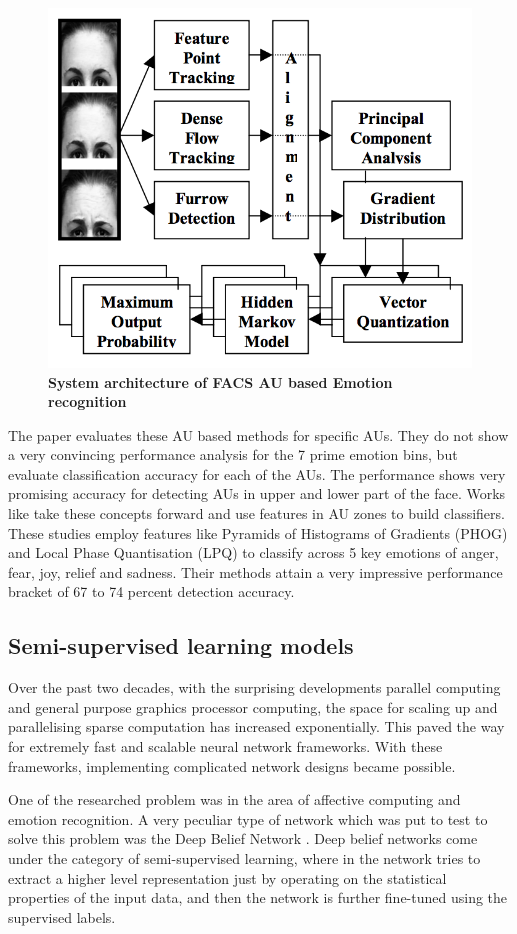 \begin{figure}
\centering
\includegraphics[width=\columnwidth]{figures/FAU_Kanade}
\caption{\textbf{System architecture of FACS AU based Emotion recognition}}
\label{fig:FACSAU}
\end{figure}

The paper evaluates these AU based methods for specific AUs. They do not show a very convincing performance analysis for the 7 prime emotion bins, but evaluate classification accuracy for each of the AUs. The performance shows very promising accuracy for detecting AUs in upper and lower part of the face. Works like \cite{1027968} \cite{5771366} take these concepts forward and use features in AU zones to build classifiers. These studies employ features like Pyramids of Histograms of Gradients (PHOG) and Local Phase Quantisation (LPQ) to classify across 5 key emotions of anger, fear, joy, relief and sadness. Their methods attain a very impressive performance bracket of 67 to 74 percent detection accuracy.

\subsection{ Semi-supervised learning models }
Over the past two decades, with the surprising developments parallel computing and general purpose graphics processor computing, the space for scaling up and parallelising sparse computation has increased exponentially. This paved the way for extremely fast and scalable neural network frameworks. With these frameworks, implementing complicated network designs became possible.
\par
One of the researched problem was in the area of affective computing and emotion recognition. A very peculiar type of network which was put to test to solve this problem was the Deep Belief Network \cite{Hinton:2006} . Deep belief networks come under the category of semi-supervised learning, where in the network tries to extract a higher level representation just by operating on the statistical properties of the input data, and then the network is further fine-tuned using the supervised labels. 